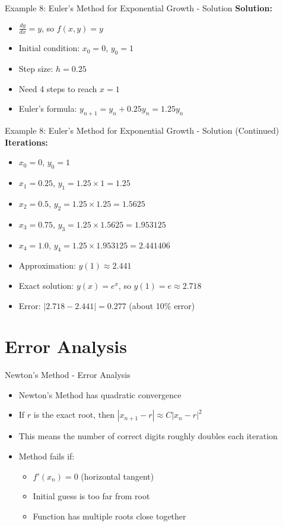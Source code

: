 \documentclass[aspectratio=169]{beamer}
\begin{document}
\begin{frame}{Example 8: Euler's Method for Exponential Growth - Solution}
\textbf{Solution:}
\begin{itemize}
    \item $\frac{dy}{dx} = y$, so $f(x,y) = y$
    \item Initial condition: $x_0 = 0$, $y_0 = 1$
    \item Step size: $h = 0.25$
    \item Need 4 steps to reach $x = 1$
    \item Euler's formula: $y_{n+1} = y_n + 0.25y_n = 1.25y_n$
\end{itemize}
\end{frame}

\begin{frame}{Example 8: Euler's Method for Exponential Growth - Solution (Continued)}
\textbf{Iterations:}
\begin{itemize}
    \item $x_0 = 0$, $y_0 = 1$
    \item $x_1 = 0.25$, $y_1 = 1.25 \times 1 = 1.25$
    \item $x_2 = 0.5$, $y_2 = 1.25 \times 1.25 = 1.5625$
    \item $x_3 = 0.75$, $y_3 = 1.25 \times 1.5625 = 1.953125$
    \item $x_4 = 1.0$, $y_4 = 1.25 \times 1.953125 = 2.441406$
    \item Approximation: $y(1) \approx 2.441$
    \item Exact solution: $y(x) = e^x$, so $y(1) = e \approx 2.718$
    \item Error: $|2.718 - 2.441| = 0.277$ (about 10\% error)
\end{itemize}
\end{frame}

\section{Error Analysis}

\begin{frame}{Newton's Method - Error Analysis}
\begin{itemize}
    \item Newton's Method has quadratic convergence
    \item If $r$ is the exact root, then $|x_{n+1} - r| \approx C|x_n - r|^2$
    \item This means the number of correct digits roughly doubles each iteration
    \item Method fails if:
    \begin{itemize}
        \item $f'(x_n) = 0$ (horizontal tangent)
        \item Initial guess is too far from root
        \item Function has multiple roots close together
    \end{itemize}
\end{itemize}
\end{frame}
\end{document}
